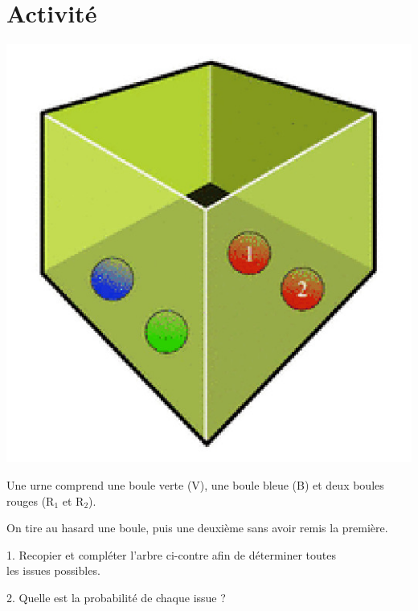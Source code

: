 \documentclass[11pt]{cornouaille}
\begin{document}

\section{Activité}



\includegraphics{./1S-VA-cours-0}


Une urne comprend une boule verte (V), une boule bleue (B) et deux
boules\\ rouges (R$_{1}$ et R$_{2}$).

On tire au hasard une boule, puis une deuxi\`{e}me sans avoir remis la
premi\`{e}re.




1.  Recopier et compl\'{e}ter l'arbre ci-contre afin de
d\'{e}terminer toutes\\ les issues possibles.



2.   Quelle est la probabilit\'{e} de chaque issue ?
\end{document}

